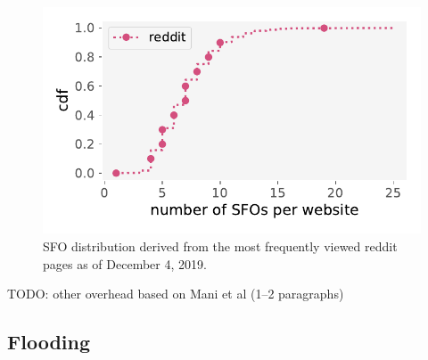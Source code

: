 \begin{figure}
	\centering
	\includegraphics[width=\columnwidth]{../exp/plot/img/sfo-dist}
	\caption{%
		SFO distribution derived from the most frequently viewed reddit pages as
		of December 4, 2019.
	}
	\label{fig:sfo-dist}
\end{figure}

TODO: other overhead based on Mani et al (1--2 paragraphs)

\subsection{Flooding} \label{sec:flooding}

